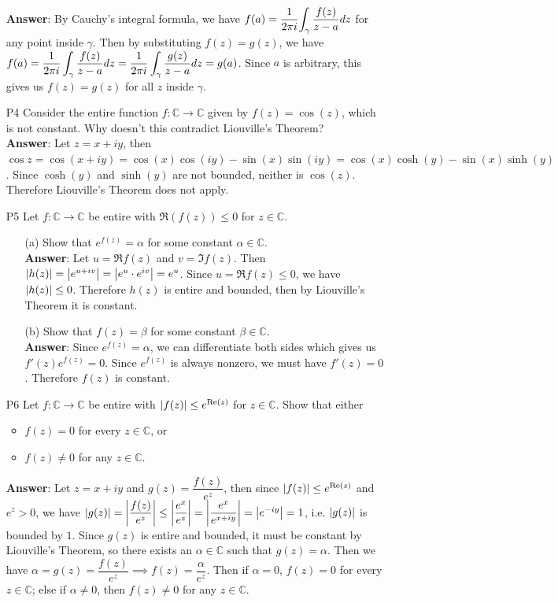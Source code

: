 \documentclass{article}
\begin{document}
\begin{itemize}
            \textbf{Answer}: By Cauchy's integral formula, we have $f(a)=\dfrac{1}{2\pi i}\mathlarger{\int_\gamma \dfrac{f(z)}{z-a}dz}$ for any point inside $\gamma$. Then by substituting $f(z)=g(z)$, we have $\mathlarger{f(a)=\dfrac{1}{2\pi i}\int_\gamma \dfrac{f(z)}{z-a}dz=\dfrac{1}{2\pi i}\int_\gamma \dfrac{g(z)}{z-a}dz}=g(a)$. Since $a$ is arbitrary, this gives us $f(z)=g(z)$ for all $z$ inside $\gamma$.
      \item [P4] Consider the entire function $f:\mathbb{C}\rightarrow\mathbb{C}$ given by $f(z)=\cos(z)$, which is not constant. Why doesn't this contradict Liouville's Theorem?\\
            \textbf{Answer}: Let $z=x+iy$, then $\cos z=\cos(x+iy)=\cos(x)\cos(iy)-\sin(x)\sin(iy)=\cos(x)\cosh(y)-\sin(x)\sinh(y)$. Since $\cosh(y)$ and $\sinh(y)$ are not bounded, neither is $\cos(z)$. Therefore Liouville's Theorem does not apply.
      \item [P5] Let $f:\mathbb{C}\rightarrow\mathbb{C}$ be entire with $\Re(f(z))\leq 0$ for $z\in\mathbb{C}$.
            \begin{itemize}
                  \item [(a)] Show that $e^{f(z)}=\alpha$ for some constant $\alpha\in\mathbb{C}$.\\
                        \textbf{Answer}: Let $u=\Re f(z)$ and $v=\Im f(z)$. Then $\abs{h(z)}=\abs{e^{u+iv}}=\abs{e^u\cdot e^{iv}}=e^u$. Since $u=\Re f(z)\leq 0$, we have $\abs{h(z)}\leq 0$. Therefore $h(z)$ is entire and bounded, then by Liouville's Theorem it is constant.
                  \item [(b)] Show that $f(z)=\beta$ for some constant $\beta\in\mathbb{C}$.\\
                        \textbf{Answer}: Since $e^{f(z)}=\alpha$, we can differentiate both sides which gives us $f'(z)e^{f(z)}=0$. Since $e^{f(z)}$ is always nonzero, we must have $f'(z)=0$. Therefore $f(z)$ is constant.
            \end{itemize}
      \item [P6] Let $f:\mathbb{C}\rightarrow\mathbb{C}$ be entire with $\abs{f(z)}\leq e^{\Re(z)}$ for $z\in\mathbb{C}$. Show that either
            \begin{itemize}
                  \item $f(z)=0$ for every $z\in\mathbb{C}$, or
                  \item $f(z)\neq 0$ for any $z\in\mathbb{C}$.
            \end{itemize}
            \textbf{Answer}: Let $z=x+iy$ and $g(z)=\dfrac{f(z)}{e^z}$, then since $\abs{f(z)}\leq e^{\Re(z)}$ and $e^z>0$, we have $\abs{g(z)}=\abs{\dfrac{f(z)}{e^z}}\leq\abs{\dfrac{e^x}{e^z}}=\abs{\dfrac{e^x}{e^{x+iy}}}=\abs{e^{-iy}}=1$, i.e. $\abs{g(z)}$ is bounded by $1$. Since $g(z)$ is entire and bounded, it must be constant by Liouville's Theorem, so there exists an $\alpha\in\mathbb{C}$ such that $g(z)=\alpha$. Then we have $\alpha=g(z)=\dfrac{f(z)}{e^z}\implies f(z)=\dfrac{\alpha}{e^z}$. Then if $\alpha=0$, $f(z)=0$ for every $z\in\mathbb{C}$; else if $\alpha\neq 0$, then $f(z)\neq 0$ for any $z\in\mathbb{C}$.
\end{itemize}
\end{document}

